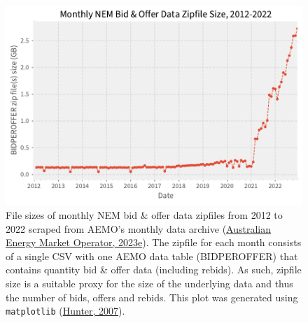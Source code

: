 \documentclass[12pt,a4paper,]{report}
\begin{document}
\begin{figure}
\hypertarget{fig:bid_file_size_2012_2022}{%
\centering
\includegraphics{source/figures/monthly_bidding_data_size_2012_2023.pdf}
\caption{File sizes of monthly NEM bid \& offer data zipfiles from 2012
to 2022 scraped from AEMO's monthly data archive
(\protect\hyperlink{ref-australianenergymarketoperatorElectricityDataModel2023}{Australian
Energy Market Operator, 2023e}). The zipfile for each month consists of
a single CSV with one AEMO data table (BIDPEROFFER) that contains
quantity bid \& offer data (including rebids). As such, zipfile size is
a suitable proxy for the size of the underlying data and thus the number
of bids, offers and rebids. This plot was generated using
\texttt{matplotlib}
(\protect\hyperlink{ref-hunterMatplotlib2DGraphics2007}{Hunter,
2007}).}\label{fig:bid_file_size_2012_2022}
}
\end{figure}
\end{document}

